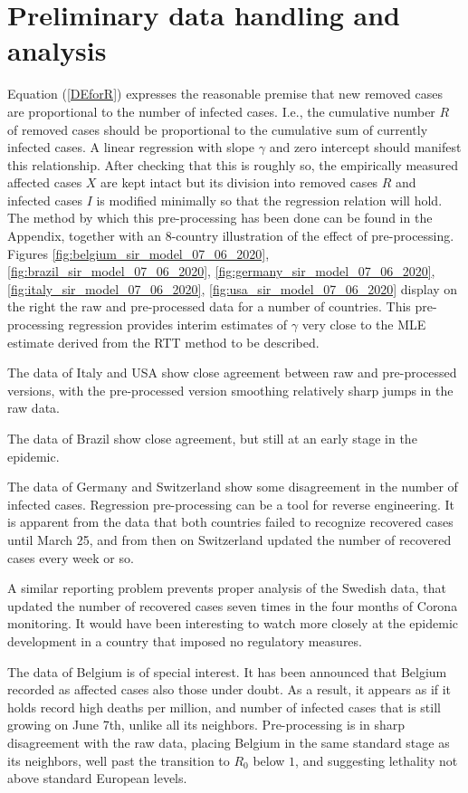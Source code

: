 \documentclass{article}
\begin{document}
\section{Preliminary data handling and analysis} \label{preliminarysection}

Equation (\ref{DEforR}) expresses the reasonable premise that new removed cases are proportional to the number of infected cases. I.e., the cumulative number $R$ of removed cases should be proportional to the cumulative sum of currently infected cases. A linear regression with slope $\gamma$ and zero intercept should manifest this relationship. After checking that this is roughly so, the empirically measured affected cases $X$ are kept intact but its division into removed cases $R$ and infected cases $I$ is modified minimally so that the regression relation will hold. The method by which this pre-processing has been done can be found in the Appendix, together with an 8-country illustration of the effect of pre-processing. Figures \ref{fig:belgium_sir_model_07_06_2020}, \ref{fig:brazil_sir_model_07_06_2020}, \ref{fig:germany_sir_model_07_06_2020}, \ref{fig:italy_sir_model_07_06_2020}, \ref{fig:usa_sir_model_07_06_2020} display on the right the raw and pre-processed data for a number of countries. This pre-processing regression provides interim estimates of $\gamma$ very close to the MLE estimate derived from the RTT method to be described.

The data of Italy and USA show close agreement between raw and pre-processed versions, with the pre-processed version smoothing relatively sharp jumps in the raw data.

The data of Brazil show close agreement, but still at an early stage in the epidemic.

The data of Germany and Switzerland show some disagreement in the number of infected cases. Regression pre-processing can be a tool for reverse engineering. It is apparent from the data that both countries failed to recognize recovered cases until March 25, and from then on Switzerland updated the number of recovered cases every week or so.

A similar reporting problem prevents proper analysis of the Swedish data, that updated the number of recovered cases seven times in the four months of Corona monitoring. It would have been interesting to watch more closely at the epidemic development in a country that imposed no regulatory measures.

The data of Belgium is of special interest. It has been announced that Belgium recorded as affected cases also those under doubt. As a result, it appears as if it holds record high deaths per million, and number of infected cases that is still growing on June 7th, unlike all its neighbors. Pre-processing is in sharp disagreement with the raw data, placing Belgium in the same standard stage as its neighbors, well past the transition to $R_0$ below $1$, and suggesting lethality not above standard European levels. 
\end{document}
